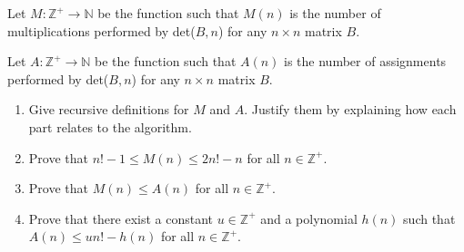 \documentclass[11pt]{article}
\def\nats {{\mathbb N}}
\def\ints {{\mathbb Z}}
\begin{document}
\begin{enumerate}
\begin{question}
Let $M: \ints^+ \rightarrow \nats$ be the function such that $M(n)$ is the number of multiplications
performed by det($B,n$) for any $n \times n$ matrix $B$.

Let $A: \ints^+ \rightarrow \nats$ be the function such that $A(n)$ is the number of assignments
performed by det($B,n$) for any $n \times n$ matrix $B$.
\end{question}

\begin{enumerate}
\item
\begin{question}
Give recursive definitions for $M$ and $A$. Justify them by explaining how each part  relates to the algorithm. 
\end{question}

\item
\begin{question}
Prove that $n! -1 \leq M(n)  \leq 2n! - n$ for all $n \in \ints^+$.
\end{question}

\item
\begin{question}
Prove that  $M(n) \leq A(n)$ for all $n \in \ints^+$.
\end{question}

\item
\begin{question}
Prove that there exist a constant $u \in \ints^+$ and a polynomial $h(n)$
such that $A(n)  \leq un! - h(n)$ for all $n \in \ints^+$.
\end{question}
\end{enumerate}
\end{enumerate}
\end{document}

